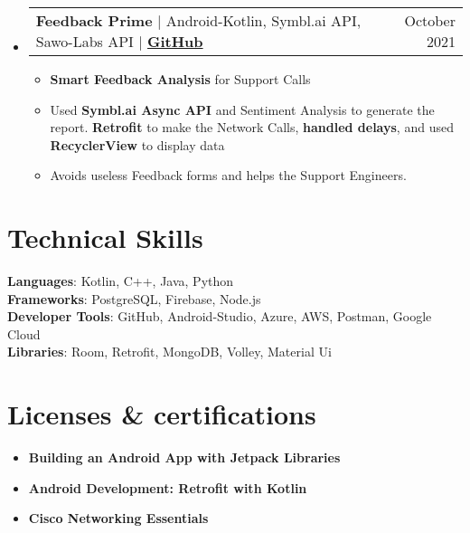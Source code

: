 \documentclass[letterpaper,11pt]{article}
\makeatletter
\newcommand{\resumeItem}[1]{
  \item\small{
    {#1 \vspace{-2pt}}
  }
}
\newcommand{\resumeProjectHeading}[2]{
    \item
    \begin{tabular*}{0.97\textwidth}{l@{\extracolsep{\fill}}r}
      \small#1 & #2 \\
    \end{tabular*}\vspace{-7pt}
}
\newcommand{\resumeSubHeadingListStart}{\begin{itemize}[leftmargin=0.15in, label={}]}
\newcommand{\resumeSubHeadingListEnd}{\end{itemize}}
\newcommand{\resumeItemListStart}{\begin{itemize}}
\newcommand{\resumeItemListEnd}{\end{itemize}\vspace{-5pt}}
\makeatother
\begin{document}
    \resumeSubHeadingListStart
      \resumeProjectHeading
          {\textbf{Feedback Prime }$|${ Android-Kotlin, Symbl.ai API, Sawo-Labs API } $|$ \textbf{\href{https://github.com/aniketk13/Feedback-Prime}{GitHub}}}{October 2021}
          \resumeItemListStart
           \resumeItem{\textbf{Smart Feedback Analysis} for Support Calls}
           \resumeItem{Used \textbf{Symbl.ai Async API} and Sentiment Analysis to generate the report. \textbf{Retrofit} to make the Network Calls, \textbf{handled delays}, and used \textbf{RecyclerView} to display data }
           \resumeItem{Avoids useless Feedback forms and helps the Support Engineers.}
          \resumeItemListEnd
    \resumeSubHeadingListEnd
\section{\textbf{Technical Skills}}
 \begin{itemize}[leftmargin=0.15in, label={}]
    \small{\item{
     \textbf{Languages}{: Kotlin, C++, Java, Python} \\
     \textbf{Frameworks}{: PostgreSQL, Firebase, Node.js } \\
     \textbf{Developer Tools}{: GitHub, Android-Studio, Azure, AWS, Postman, Google Cloud} \\
     \textbf{Libraries}{: Room, Retrofit, MongoDB, Volley, Material Ui  }
    }} 
 \end{itemize}
   
\section{\textbf{Licenses \& certifications}}
 \begin{itemize}[leftmargin=0.15in, label={}]
    \small{\item{
        \resumeItemListStart
                \resumeItem{\textbf{{Building an Android App with Jetpack Libraries}}}
                \resumeItem{\textbf{{Android Development: Retrofit with Kotlin}}} 

                \resumeItem{\textbf{{Cisco Networking Essentials}}} 
      \resumeItemListEnd
    }}
 \end{itemize}
    
\end{document}
